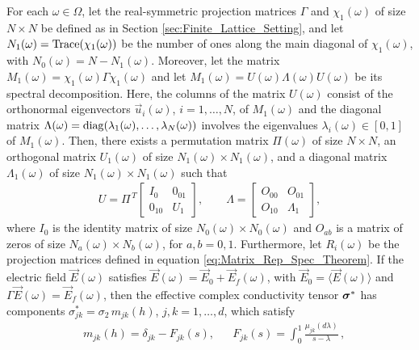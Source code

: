 \documentclass{cmslatex}
\newcommand\bsig{\mbox{\boldmath${\sigma}$}}
\begin{document}
\begin{theorem}\label{thm:Discrete_Spectral_Theorem_ACM}
  For each $\omega\in\Omega$, let the real-symmetric projection matrices $\Gamma$
  and $\chi_1(\omega)$ of size $N\times N$ be defined as in Section
  \ref{sec:Finite_Lattice_Setting},  and let $N_1(\omega)={\rm
    Trace}(\chi_1(\omega))$ be the number of ones along the main diagonal of
  $\chi_1(\omega)$, with $N_0(\omega)=N-N_1(\omega)$. Moreover, let the matrix
  $M_1(\omega)=\chi_1(\omega)\Gamma\chi_1(\omega)$ and let $M_1(\omega)=U(\omega)\Lambda(\omega)U(\omega)$ be its spectral
  decomposition. Here, the columns of the matrix $U(\omega)$ consist of the
  orthonormal eigenvectors $\vec{u}_i(\omega)$, $i=1,\ldots,N$, of $M_1(\omega)$ and the
  diagonal matrix $\Lambda(\omega)={\rm diag}(\lambda_1(\omega),\ldots,\lambda_N(\omega))$ involves the
  eigenvalues $\lambda_i(\omega)\in[0,1]$ of $M_1(\omega)$. Then, there exists a
  permutation matrix $\Pi(\omega)$ of size $N\times N$, an orthogonal matrix
  $U_1(\omega)$ of size $N_1(\omega)\times N_1(\omega)$, and a diagonal matrix $\Lambda_1(\omega)$
  of size $N_1(\omega)\times N_1(\omega)$ such that     
  \begin{align}\label{eq:Spec_Decomp_chi_Gamma_chi}
U=\Pi^{\,T}\left[
  \begin{array}{ccc}
    I_0&0_{01}\\
    0_{10}&U_1   
    \end{array}
\right],
\qquad
\Lambda=\left[
  \begin{array}{ccc}
    O_{00}&O_{01}\\
    O_{10}&\Lambda_1   
    \end{array}
\right],
  \end{align}
  where $I_0$ is the identity matrix of size $N_0(\omega)\times N_0(\omega)$ and $O_{ab}$
  is a matrix of zeros of size $N_a(\omega)\times N_b(\omega)$, for $a,b=0,1$. 
  Furthermore, let $R_i(\omega)$ be the projection matrices defined in
  equation \eqref{eq:Matrix_Rep_Spec_Theorem}. If the electric field
  $\vec{E}(\omega)$ satisfies $\vec{E}(\omega)=\vec{E}_0+\vec{E}_f(\omega)$, with
  $\vec{E}_0=\langle\vec{E}(\omega)\rangle$ and $\Gamma\vec{E}(\omega)=\vec{E}_f(\omega)$, then the
  effective complex conductivity tensor $\bsig^*$ has components 
  $\sigma_{jk}^*=\sigma_2\,m_{jk}(h)$, $j,k=1,\ldots,d$,  which satisfy     
%
\begin{align}\label{eq:Stieltjes_F_Discrete_appendix}
  &m_{jk}(h)=\delta_{jk}-F_{jk}(s), 
  &&F_{jk}(s)=\int_0^1\frac{\mu_{jk}(d\lambda)}{s-\lambda}\,, 

\end{align}
\end{theorem}
\end{document}
